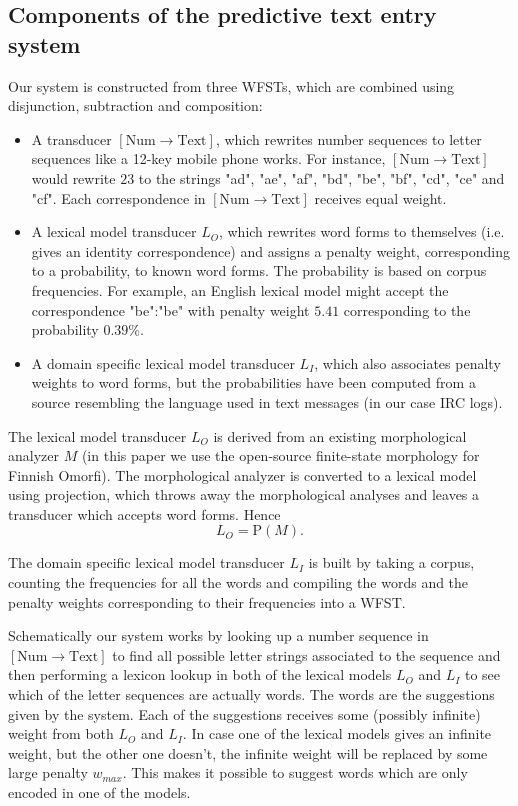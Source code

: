 \documentclass[a4paper,conference]{IEEEtran}
\begin{document}
\subsection{Components of the predictive text entry system}

Our system is constructed from three WFSTs, which are combined using
disjunction, subtraction and composition:

\begin{itemize}
\item A transducer $[\mathrm{Num}\rightarrow\mathrm{Text}]$, which
  rewrites number sequences to letter sequences like a 12-key mobile phone
  works. For instance, $[\mathrm{Num}\rightarrow\mathrm{Text}]$ would rewrite
  $23$ to the strings "ad", "ae", "af", "bd", "be", "bf", "cd", "ce"
  and "cf". Each correspondence in $[\mathrm{Num}\rightarrow\mathrm{Text}]$
  receives equal weight.
\item A lexical model transducer $L_O$, which rewrites word forms to
  themselves (i.e. gives an identity correspondence) and assigns a
  penalty weight, corresponding to a probability, to known word
  forms. The probability is based on corpus frequencies. For example, an English
  lexical model might accept the correspondence "be":"be" with penalty
  weight $5.41$ corresponding to the probability $0.39 \%$.
\item A domain specific lexical model transducer $L_I$, which also
  associates penalty weights to word forms, but the probabilities have
  been computed from a source resembling the language used in
  text messages (in our case IRC logs).
\end{itemize}

The lexical model transducer $L_O$ is derived from an existing morphological
analyzer $M$ (in this paper we use the open-source finite-state
morphology for Finnish Omorfi). The morphological analyzer is
converted to a lexical model using projection, which throws away the
morphological analyses and leaves a transducer which accepts
word forms. Hence
\begin{equation}L_O = \mathrm{P}(M)\text{.}\end{equation}

The domain specific lexical model transducer $L_I$ is built by taking a
corpus, counting the frequencies for all the words and compiling the
words and the penalty weights corresponding to their frequencies into
a WFST.

Schematically our system works by looking up a number sequence in
$[\mathrm{Num}\rightarrow\mathrm{Text}]$ to find all possible letter
strings associated to the sequence and then performing a lexicon
lookup in both of the lexical models $L_O$ and $L_I$ to see which of the
letter sequences are actually words. The words are the suggestions
given by the system. Each of the suggestions receives some (possibly
infinite) weight from both $L_O$ and $L_I$. In case one of the
lexical models gives an infinite weight, but the other one doesn't, the
infinite weight will be replaced by some large penalty $w_{max}$. This
makes it possible to suggest words which are only encoded in one of
the models.
\end{document}
